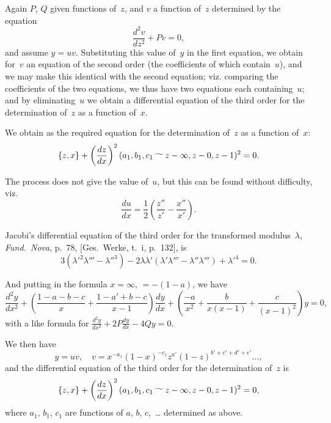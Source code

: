 \documentclass[11pt,a4paper]{book}
\begin{document}
\begin{art}
Again $P$, $Q$ given functions of~$z$, and $v$ a function of~$z$ determined
by the equation
\[
\frac{d^2v}{dz^2} + Pv = 0,
\]
and assume $y = uv$. Substituting this value of~$y$ in the first equation,
we obtain for~$v$ an equation of the second order (the coefficients of which
contain~$u$), and we may make this identical with the second equation;
viz. comparing the coefficients of the two equations, we thus have two
equations each containing~$u$; and by eliminating~$u$ we obtain a
differential equation of the third order for the determination of~$z$ as a
function of~$x$.
\end{art}

\begin{art}
We obtain as the required equation for the determination of~$z$ as a
function of~$x$:
\[
\{z, x\} + \left(\frac{dz}{dx}\right)^2 (a_1, b_1, c_1 \,\raisebox{-.5ex}{$\widetilde{\phantom{aa}}$}\, z-\infty, z-0, z-1)^2 = 0.
\]

The process does not give the value of~$u$, but this can be found without
difficulty, viz.
\[
\frac{du}{dx} = \frac{1}{2} \left(\frac{z''}{z'} - \frac{x''}{x'}\right).
\]
\end{art}

\begin{art}
Jacobi's differential equation of the third order for the transformed
modulus~$\lambda$, \textit{Fund.~Nova}, p.~78, [Ges.\ Werke, t.~i, p.~132], is
\[
3(\lambda'^2 \lambda''' - \lambda''^3) - 2\lambda \lambda' (\lambda' \lambda''' - \lambda'' \lambda''') + \lambda'^4 = 0.
\]
\end{art}

\begin{art}
And putting in the formula $x = \infty$, $= -(1-a)$, we have
\[
\frac{d^2y}{dx^2} + \left(\frac{1-a-b-c}{x} + \frac{1-a'+b-c}{x-1}\right) \frac{dy}{dx}
+ \left(\frac{-a}{x^2} + \frac{b}{x(x-1)} + \frac{c}{(x-1)^2}\right) y = 0,
\]
with a like formula for $\frac{d^2y}{dx^2} + 2P \frac{dy}{dx} - 4Qy = 0$.

We then have
\[
y = uv, \quad v = x^{-a_1} (1-x)^{-c_1} z^{a'} (1-z)^{b'+c'+d'+e'} \ldots,
\]
and the differential equation of the third order for the determination
of~$z$ is
\[
\{z, x\} + \left(\frac{dz}{dx}\right)^2 (a_1, b_1, c_1 \,\raisebox{-.5ex}{$\widetilde{\phantom{aa}}$}\, z-\infty, z-0, z-1)^2 = 0,
\]
where $a_1$, $b_1$, $c_1$ are functions of $a$, $b$, $c$,~\ldots
determined as above.
\end{art}
\end{document}
